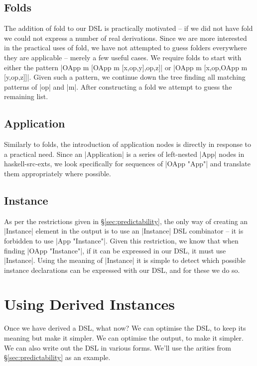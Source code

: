 \documentclass[preprint,draft]{sigplanconf}
\begin{document}
\subsection{Folds}

The addition of fold to our DSL is practically motivated -- if we did not have fold we could not express a number of real derivations. Since we are more interested in the practical uses of fold, we have not attempted to guess folders everywhere they are applicable -- merely a few useful cases. We require folds to start with either the pattern |OApp m [OApp m [x,op,y],op,z]| or |OApp m [x,op,OApp m [y,op,z]]|. Given such a pattern, we continue down the tree finding all matching patterns of |op| and |m|. After constructing a fold we attempt to guess the remaining list.

\subsection{Application}

Similarly to folds, the introduction of application nodes is directly in response to a practical need. Since an |Application| is a series of left-nested |App| nodes in haskell-src-exts, we look specifically for sequences of |OApp "App"| and translate them appropriately where possible.

\subsection{Instance}

As per the restrictions given in \S\ref{sec:predictability}, the only way of creating an |Instance| element in the output is to use an |Instance| DSL combinator -- it is forbidden to use |App "Instance"|. Given this restriction, we know that when finding |OApp "Instance"|, if it can be expressed in our DSL, it must use |Instance|. Using the meaning of |Instance| it is simple to detect which possible instance declarations can be expressed with our DSL, and for these we do so.

\section{Using Derived Instances}
\label{sec:using}

Once we have derived a DSL, what now? We can optimise the DSL, to keep its meaning but make it simpler. We can optimise the output, to make it simpler. We can also write out the DSL in various forms. We'll use the arities from \S\ref{sec:predictability} as an example.
\end{document}
